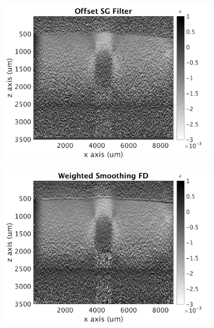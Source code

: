 \begin{figure}[h]
    \\
    \begin{subfigure}{0.49\textwidth}
    	\centering
        \includegraphics[width=\textwidth]{appendix_figs/posg_fr40_lr0.png}
    \end{subfigure}
    \begin{subfigure}{0.49\textwidth}
    	\centering
        \includegraphics[width=\textwidth]{appendix_figs/wfd_fr40_lr0.png}
    \end{subfigure}
    \\
    \begin{subfigure}{0.49\textwidth}
    	\centering

\end{subfigure}
\end{figure}

